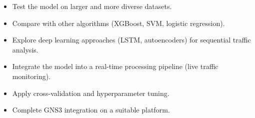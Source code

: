 \begin{itemize}[leftmargin=*,itemsep=2pt]
    \item Test the model on larger and more diverse datasets.
    \item Compare with other algorithms (XGBoost, SVM, logistic regression).
    \item Explore deep learning approaches (LSTM, autoencoders) for sequential traffic analysis.
    \item Integrate the model into a real-time processing pipeline (live traffic monitoring).
    \item Apply cross-validation and hyperparameter tuning.
    \item Complete GNS3 integration on a suitable platform.
\end{itemize}

